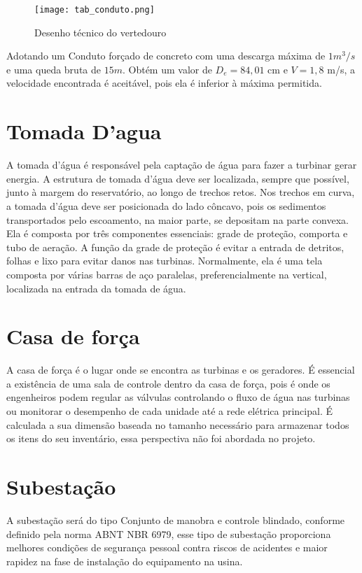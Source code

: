 \begin{figure}[h]
	\centering
	\texttt{[image: tab\_conduto.png]}
	\caption{Desenho técnico do vertedouro}
	\label{fig:tab_conduto}
\end{figure}

Adotando um Conduto forçado de concreto com uma descarga máxima de $1 m^3/s$ e uma queda bruta de $15m$. Obtém um valor de $D_{e}=84,01$ cm e $V=1,8$ m/s, a velocidade encontrada é aceitável, pois ela é inferior à máxima permitida.

\section{Tomada D'agua} 
A tomada d’água é responsável pela captação de água para fazer a turbinar gerar energia. A estrutura de tomada d’água deve ser localizada, sempre que possível, junto à margem do reservatório, ao longo de trechos retos. Nos trechos em curva, a tomada d’água deve ser posicionada do lado côncavo, pois os sedimentos transportados pelo escoamento, na maior parte, se depositam na parte convexa. Ela é composta por três componentes essenciais: grade de proteção, comporta e tubo de aeração.
A função da grade de proteção é evitar a entrada de detritos, folhas e lixo para evitar danos nas turbinas. Normalmente, ela é uma tela composta por várias barras de aço paralelas, preferencialmente na vertical, localizada na entrada da tomada de água.

\section{Casa de força}
A casa de força é o lugar onde se encontra as turbinas e os geradores. É essencial a existência de uma sala de controle dentro da casa de força, pois é onde os engenheiros podem regular as válvulas controlando o fluxo de água nas turbinas ou monitorar o desempenho de cada unidade até a rede elétrica principal. É calculada a sua dimensão baseada no tamanho necessário para armazenar todos os itens do seu inventário, essa perspectiva não foi abordada no projeto.

\section{Subestação}
A subestação será do tipo Conjunto de manobra e controle blindado, conforme definido pela norma ABNT NBR 6979, esse tipo de subestação proporciona melhores condições de segurança pessoal contra riscos de acidentes e maior rapidez na fase de instalação do equipamento na usina.

